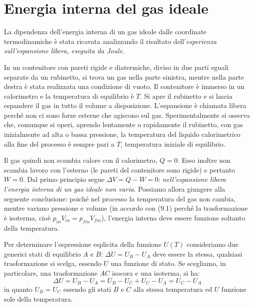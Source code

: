 \documentclass[class=book, crop=false, oneside, 12pt]{standalone}
\begin{document}
\section{Energia interna del gas ideale}

La dipendenza dell'energia interna di un gas ideale dalle coordinate termodinamiche è stata ricavata analizzando il risultato dell'\emph{esperienza sull'espansione libera, eseguita da Joule}. 

In un contenitore con pareti rigide e diatermiche, diviso in due parti eguali separate da un rubinetto, si trova un gas nella parte sinistra, mentre nella parte destra è stata realizzata una condizione di vuoto. 
Il contenitore è immerso in un calorimetro e la temperatura di equilibrio è \(T\). 
Si apre il rubinetto e si lascia espandere il gas in tutto il volume a disposizione. 
L'espansione è chiamata libera perché non ci sono forze esterne che agiscono sul gas.
Sperimentalmente si osserva che, comunque si operi, aprendo lentamente o rapidamente il rubinetto, con gas inizialmente ad alta o bassa pressione, la temperatura del liquido calorimetrico alla fine del processo è sempre pari a \(T\), temperatura iniziale di equilibrio.

Il gas quindi non scambia calore con il calorimetro, \(Q = 0\). 
Esso inoltre non scambia lavoro con l'esterno (le pareti del contenitore sono rigide) e pertanto \(W = 0\). 
Dal primo principio segue \(\Delta V = Q - W = 0\): \emph{nell'espansione libera l'energia interna di un gas ideale non varia}. 
Possiamo allora giungere alla seguente conclusione: poiché nel processo la temperatura del gas non cambia, mentre variano pressione e volume (in accordo con (9.1) perché la trasformazione è isoterma, cioè \(p_{in} V_{in} = p_{fin} V_{fin}\)), l'energia interna deve essere funzione soltanto della temperatura. 

Per determinare l'espressione esplicita della funzione \(U(T)\) consideriamo due generici stati di equilibrio \(A\) e \(B\): \(\Delta U = U_B - U_A\) deve essere la stessa, qualsiasi trasformazione si scelga, essendo \(U\) una funzione di stato.
Se scegliamo, in particolare, una trasformazione \(A C\) isocora e una isoterma, si ha:
\begin{equation*}
    \Delta U = U_B - U_A = U_B - U_C + U_C - U_A = U_C - U_A
\end{equation*}
in quanto \(U_B = U_C\) essendo gli stati \(B\) e \(C\) alla stessa temperatura ed \(U\) funzione sole della temperatura.
\end{document}
